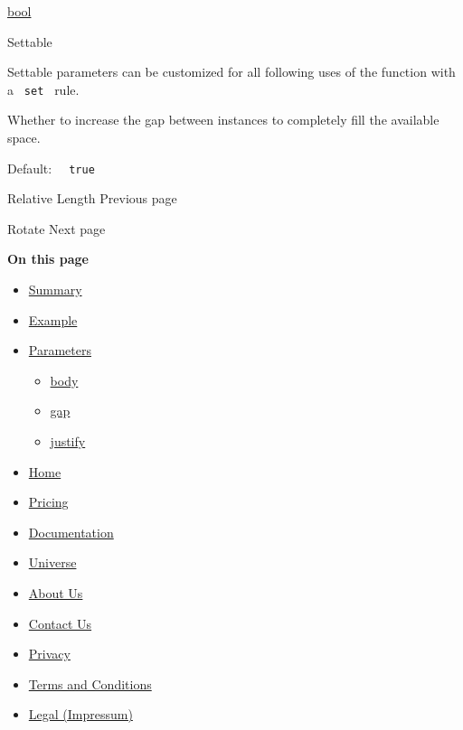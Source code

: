 \href{/docs/reference/foundations/bool/}{bool}

{{ Settable }}

\label{parameters-justify-settable-tooltip}
Settable parameters can be customized for all following uses of the
function with a \texttt{\ set\ } rule.

Whether to increase the gap between instances to completely fill the
available space.

Default: \texttt{\ }{\texttt{\ true\ }}\texttt{\ }

\href{/docs/reference/layout/relative/}{\pandocbounded{}}

{ Relative Length } { Previous page }

\href{/docs/reference/layout/rotate/}{\pandocbounded{}}

{ Rotate } { Next page }

\textbf{On this page}

\begin{itemize}
\tightlist
\item
  \hyperref[summary]{Summary}
\item
  \hyperref[example]{Example}
\item
  \hyperref[parameters]{Parameters}

  \begin{itemize}
  \tightlist
  \item
    \hyperref[parameters-body]{body}
  \item
    \hyperref[parameters-gap]{gap}
  \item
    \hyperref[parameters-justify]{justify}
  \end{itemize}
\end{itemize}

\begin{itemize}
\tightlist
\item
  \href{/}{Home}
\item
  \href{/pricing/}{Pricing}
\item
  \href{/docs/}{Documentation}
\item
  \href{/universe/}{Universe}
\item
  \href{/about/}{About Us}
\item
  \href{/contact/}{Contact Us}
\item
  \href{/privacy/}{Privacy}
\item
  \href{https://typst.app/terms}{Terms and Conditions}
\item
  \href{/legal/}{Legal (Impressum)}
\end{itemize}

